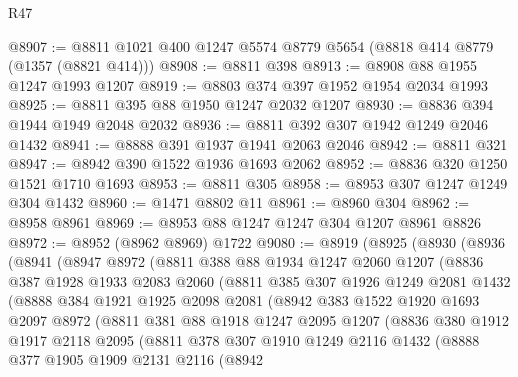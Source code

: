\begin{lexlean}{R47}
\begin{coremodule}
@8907 := @8811 @1021 @400 @1247 @5574 @8779 @5654 (@8818 @414 @8779 (@1357 (@8821 @414)))
@8908 := @8811 @398
@8913 := @8908 @88 @1955 @1247 @1993 @1207
@8919 := @8803 @374 @397 @1952 @1954 @2034 @1993
@8925 := @8811 @395 @88 @1950 @1247 @2032 @1207
@8930 := @8836 @394 @1944 @1949 @2048 @2032
@8936 := @8811 @392 @307 @1942 @1249 @2046 @1432
@8941 := @8888 @391 @1937 @1941 @2063 @2046
@8942 := @8811 @321
@8947 := @8942 @390 @1522 @1936 @1693 @2062
@8952 := @8836 @320 @1250 @1521 @1710 @1693
@8953 := @8811 @305
@8958 := @8953 @307 @1247 @1249 @304 @1432
@8960 := @1471 @8802 @11
@8961 := @8960 @304
@8962 := @8958 @8961
@8969 := @8953 @88 @1247 @1247 @304 @1207 @8961 @8826
@8972 := @8952 (@8962 @8969) @1722
@9080 := @8919
    (@8925
      (@8930
        (@8936
          (@8941
            (@8947
              @8972
              (@8811
                @388
                @88
                @1934
                @1247
                @2060
                @1207
                (@8836
                  @387
                  @1928
                  @1933
                  @2083
                  @2060
                  (@8811
                    @385
                    @307
                    @1926
                    @1249
                    @2081
                    @1432
                    (@8888
                      @384
                      @1921
                      @1925
                      @2098
                      @2081
                      (@8942
                        @383
                        @1522
                        @1920
                        @1693
                        @2097
                        @8972
                        (@8811
                          @381
                          @88
                          @1918
                          @1247
                          @2095
                          @1207
                          (@8836
                            @380
                            @1912
                            @1917
                            @2118
                            @2095
                            (@8811
                              @378
                              @307
                              @1910
                              @1249
                              @2116
                              @1432
                              (@8888
                                @377
                                @1905
                                @1909
                                @2131
                                @2116
                                (@8942

\end{coremodule}
\end{lexlean}
